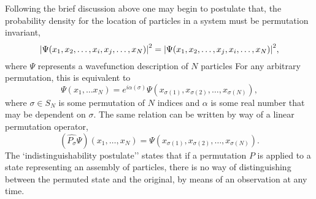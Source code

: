     Following the brief discussion above one may begin to postulate that, the probability density
    for the location of particles in a system must be permutation invariant,
    \begin{equation}
        \label{eq:square_wavefunction_pauli}
        \abs{\Psi(x_1, x_2, \dots, x_i, x_j, \dots, x_N)}^2 
        = 
        \abs{\Psi(x_1, x_2, \dots, x_j, x_i, \dots, x_N)}^2,
    \end{equation}
    where $\Psi$ represents a wavefunction description of $N$ particles 
    For any arbitrary permutation, this is equivalent to 
    \begin{equation}
        \Psi(x_1, \dots x_N) 
        =
        e^{i\alpha(\sigma)}\Psi(x_{\sigma(1)}, x_{\sigma(2)}, \dots, x_{\sigma(N)}),
    \end{equation}
    where $\sigma \in S_N$ is some permutation of $N$ indices and $\alpha$ is 
    some real number that may be dependent on $\sigma$.
    The same relation can be written by way of a linear permutation operator,
    \begin{equation}
        (\hat{P_\sigma}\Psi)(x_1, \dots, x_N)
        =
        \Psi(x_{\sigma(1)}, x_{\sigma(2)}, \dots, x_{\sigma(N)}).
    \end{equation}
    The `indistinguishability postulate'' states that if a permutation $P$ is applied 
    to a state representing an assembly of particles, there is no way of distinguishing
    between the permuted state and the original, by means of an observation at any time.

